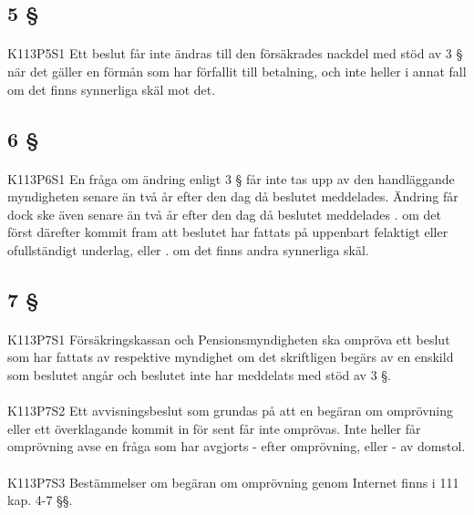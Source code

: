 \documentclass[a4paper,notitlepage,openany,10pt]{book}
\begin{document}
\subsection*{5 §}
\paragraph*{}
{\tiny K113P5S1}
Ett beslut får inte ändras till den försäkrades nackdel med stöd av 3 § när det gäller en förmån som har förfallit till betalning, och inte heller i annat fall om det finns synnerliga skäl mot det.
\subsection*{6 §}
\paragraph*{}
{\tiny K113P6S1}
En fråga om ändring enligt 3 § får inte tas upp av den handläggande myndigheten senare än två år efter den dag då beslutet meddelades. Ändring får dock ske även senare än två år efter den dag då beslutet meddelades
. om det först därefter kommit fram att beslutet har fattats på uppenbart felaktigt eller ofullständigt underlag, eller
. om det finns andra synnerliga skäl.
\subsection*{7 §}
\paragraph*{}
{\tiny K113P7S1}
Försäkringskassan och Pensionsmyndigheten ska ompröva ett beslut som har fattats av respektive myndighet om det skriftligen begärs av en enskild som beslutet angår och beslutet inte har meddelats med stöd av 3 §.
\paragraph*{}
{\tiny K113P7S2}
Ett avvisningsbeslut som grundas på att en begäran om omprövning eller ett överklagande kommit in för sent får inte omprövas. Inte heller får omprövning avse en fråga som har avgjorts
\newline - efter omprövning, eller
\newline - av domstol.
\paragraph*{}
{\tiny K113P7S3}
Bestämmelser om begäran om omprövning genom Internet finns i 111 kap. 4-7 §§.
\end{document}
